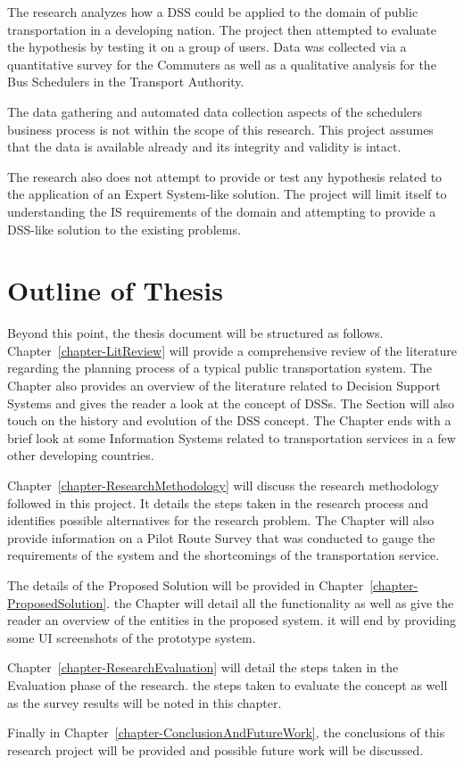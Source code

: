 The research analyzes how a DSS could be applied to the domain of public transportation in a developing nation. The project then attempted to evaluate the hypothesis by testing it on a group of users. Data was collected via a quantitative survey for the Commuters as well as a qualitative analysis for the Bus Schedulers in the Transport Authority.

The data gathering and automated data collection aspects of the schedulers business process is not within the scope of this research. This project assumes that the data is available already and its integrity and validity is intact.

The research also does not attempt to provide or test any hypothesis related to the application of an Expert System-like solution. The project will limit itself to understanding the IS requirements of the domain and attempting to provide a DSS-like solution to the existing problems.

\section{Outline of Thesis}
\label{section-OutlineOfThesis}

Beyond this point, the thesis document will be structured as follows. Chapter~\ref{chapter-LitReview} will provide a comprehensive review of the literature regarding the planning process of a typical public transportation system. The Chapter also provides an overview of the literature related to Decision Support Systems and gives the reader a look at the concept of DSSs. The Section will also touch on the history and evolution of the DSS concept. The Chapter ends with a brief look at some Information Systems related to transportation services in a few other developing countries.

Chapter~\ref{chapter-ResearchMethodology} will discuss the research methodology followed in this project. It details the steps taken in the research process and identifies possible alternatives for the research problem. The Chapter will also provide information on a Pilot Route Survey that was conducted to gauge the requirements of the system and the shortcomings of the transportation service.

The details of the Proposed Solution will be provided in Chapter~\ref{chapter-ProposedSolution}. the Chapter will detail all the functionality as well as give the reader an overview of the entities in the proposed system. it will end by providing some UI screenshots of the prototype system.

Chapter~\ref{chapter-ResearchEvaluation} will detail the steps taken in the Evaluation phase of the research. the steps taken to evaluate the concept as well as the survey results will be noted in this chapter.

Finally in Chapter~\ref{chapter-ConclusionAndFutureWork}, the conclusions of this research project will be provided and possible future work will be discussed.